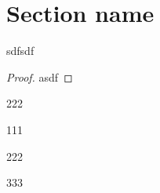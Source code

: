\documentclass[../main]{subfiles} %
\begin{document}
\section{Section name}

\begin{theorem}
    sdfsdf
\end{theorem}
\begin{proof}
    asdf
\end{proof}
\begin{definition}
    222
\end{definition}

\begin{eg}
    111
\end{eg}
\begin{prop}
    222
\end{prop}
\begin{corollary}
    333
\end{corollary}
\end{document}
